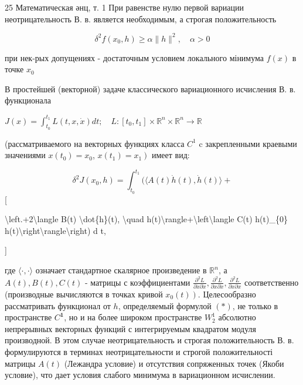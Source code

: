 \documentclass[10pt]{article}
\begin{document}
25 Математическая әнц, т. 1 При равенстве нулю первой вариации неотрицательность В. в. является необходимым, а строгая положительность



\[

\delta^{2} f\left(x_{0}, h\right) \geqslant \alpha\|h\|^{2}, \quad \alpha>0

\]



при нек-рых допущениях - достаточным условием локального мінимума $f(x)$ в точке $x_{0}$



В простейшей (векторной) задаче классического вариационного исчисления В. в. функционала



$J(x)=\int_{t_{0}}^{t_{1}} L(t, x, \dot{x}) d t ; \quad L:\left[t_{0}, t_{1}\right] \times \mathbb{R}^{n} \times \mathbb{R}^{n} \longrightarrow \mathbb{R}$



(рассматриваемого на векторных функциях класса $C^{1}$ c закрепленными краевыми значениями $x\left(t_{0}\right)=x_{0}$, $\left.x\left(t_{1}\right)=x_{1}\right)$ имеет вид:



\[

\delta^{2} J\left(x_{0}, h\right)=\int_{t_{0}}^{t_{1}}(\langle A(t) \dot{h}(t), \dot{h}(t)\rangle+

\][



\textbackslash left.+2\textbackslash langle B(t) \textbackslash dot\{h\}(t), \textbackslash quad h(t)\textbackslash rangle+\textbackslash left\textbackslash langle C(t) h(t)\_\{0\} h(t)\textbackslash right\textbackslash rangle\textbackslash right) d t,

]



где $\langle\cdot, \cdot\rangle$ означает стандартное скалярное произведение в $\mathbb{R}^{n}$, а $A(t), B(t), C(t)$ - матрицы с коэффициентами $\frac{\partial^{2} L}{\partial \dot{x} \partial \dot{x}}, \frac{\partial^{2} L}{\partial x \partial \dot{x}}, \frac{\partial^{2} L}{\partial x \partial x}$ соответственно (производные вычисляются в точках кривой $\left.x_{0}(t)\right)$. Целесообразно рассматривать функционал от $h$, определяемый формулой $(*)$, не только в пространстве $C^{\mathbf{1}}$, но и на более широком пространстве $W_{2}^{1}$ абсолютно непрерывных векторных функций с интегрируемым квадратом модуля производной. В этом случае неотрицательность и строгая положительность В. в. формулируются в терминах неотрицательности и строгой положительності матрицы $A(t)$ (Лежандра условие) и отсутствия сопряженных точек (Якоби условие), что дает условия слабого минимума в вариационном исчислении.
\end{document}
